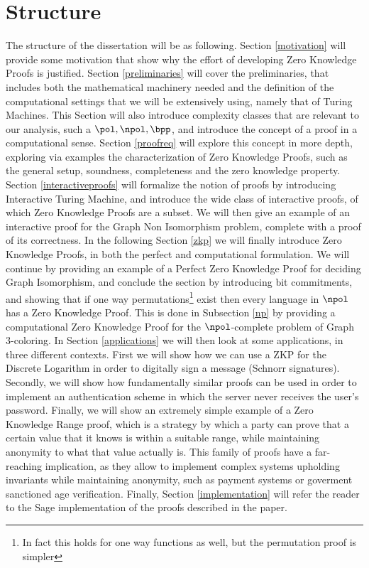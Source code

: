 \documentclass{article}
\begin{document}
\section{Structure}
The structure of the dissertation will be as following. Section \ref{motivation} will provide some motivation that show why
the effort of developing Zero Knowledge Proofs is justified. Section \ref{preliminaries} will cover the preliminaries,
that includes both the mathematical machinery needed and the definition of the computational settings that we will
be extensively using, namely that of Turing Machines. This Section will also introduce complexity classes that are
relevant to our analysis, such a $\pol, \npol, \bpp$, and introduce the concept of a proof in a computational sense.
Section \ref{proofreq} will explore this concept in more depth, exploring via examples the characterization of
Zero Knowledge Proofs, such as the general setup, soundness, completeness and the zero knowledge property.
Section \ref{interactiveproofs} will formalize the notion of proofs by introducing Interactive Turing Machine, and
introduce the wide class of interactive proofs, of which Zero Knowledge Proofs are a subset. We will then give an
example of an interactive proof for the Graph Non Isomorphism problem, complete with a proof of its correctness.
In the following Section \ref{zkp} we will finally introduce Zero Knowledge Proofs, in both the perfect and computational
formulation. We will continue by providing an example of a Perfect Zero Knowledge Proof for deciding Graph Isomorphism,
and conclude the section by introducing bit commitments, and showing that if one way permutations\footnote{In fact this holds for one way functions as well, but the permutation proof is simpler} exist
then every language in $\npol$ has a Zero Knowledge Proof. This is done in Subsection \ref{np} by providing a
computational Zero Knowledge Proof for the $\npol$-complete problem of Graph 3-coloring.
In Section \ref{applications} we will then look at some applications, in three different contexts. First we will
show how we can use a ZKP for the Discrete Logarithm in order to digitally sign a message (Schnorr signatures). Secondly,
we will show how fundamentally similar proofs can be used in order to implement an authentication scheme in which the
server never receives the user's password. Finally, we will show an extremely simple example of a Zero Knowledge Range
proof, which is a strategy by which a party can prove that a certain value that it knows is within a suitable range, while
maintaining anonymity to what that value actually is. This family of proofs have a far-reaching implication, as they allow
to implement complex systems upholding invariants while maintaining anonymity, such as payment systems or goverment sanctioned
age verification. Finally, Section \ref{implementation} will refer the reader to the Sage implementation of the proofs described
in the paper.
\end{document}
